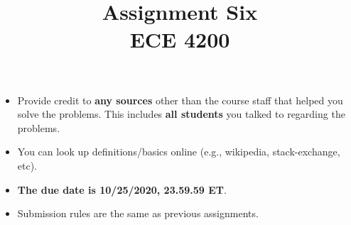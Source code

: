 \documentclass[11pt]{article}
\title{Assignment Six\\ ECE 4200}
\date{}
\begin{document}
\maketitle 


\begin{itemize}
\item
Provide credit to \textbf{any sources} other than the course staff that helped you solve the problems. This includes \textbf{all students} you talked to regarding the problems. 	
\item
You can look up definitions/basics online (e.g., wikipedia, stack-exchange, etc).
\item
{\bf The due date is 10/25/2020, 23.59.59 ET}. 
\item
Submission rules are the same as previous assignments.
\end{itemize}
\end{document}
